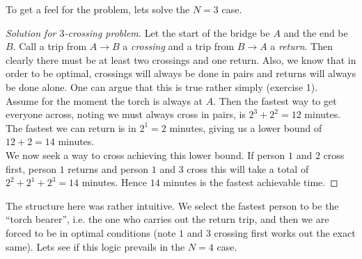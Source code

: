 \documentclass{article}
\begin{document}
To get a feel for the problem, lets solve the $N=3$ case. 

\begin{proof}[Solution for $3$-crossing problem]    
    Let the start of the bridge be $A$ and the end be $B$. Call a trip from $A \to B$ a {\it crossing} and a trip 
    from $B \to A$ a {\it return}. Then clearly there must be at least two crossings and one return. Also, we know 
    that in order to be optimal, crossings will always be done in pairs and returns will always be done alone. One 
    can argue that this is true rather simply (exercise 1). \\
    
    Assume for the moment the torch is always at $A$. Then the fastest way to get everyone across, noting we must 
    always cross in pairs, is $2^3 + 2^2 = 12$ minutes. The fastest we can return is in $2^1=2$ minutes, giving us 
    a lower bound of $12 + 2 = 14$ minutes. \\

    We now seek a way to cross achieving this lower bound. If person $1$ and $2$ cross first, person $1$ returns and
    person $1$ and $3$ cross this will take a total of $2^2 + 2^1 + 2^3 = 14$ minutes. Hence $14$ minutes is the 
    fastest achievable time.
\end{proof}

The structure here was rather intuitive. We select the fastest person to be the ``torch bearer'', i.e. the one who 
carries out the return trip, and then we are forced to be in optimal conditions (note $1$ and $3$ crossing first 
works out the exact same). Lets see if this logic prevails in the $N=4$ case. 
\end{document}
